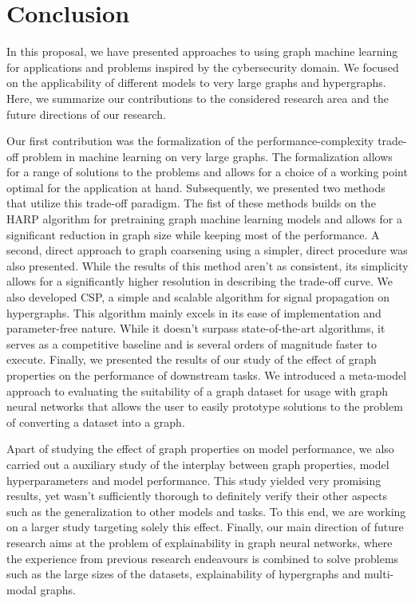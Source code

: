 \chapter{Conclusion}
\label{chap:conclusion}

In this proposal, we have presented approaches to using graph machine learning for applications and problems inspired by the cybersecurity domain. We focused on the applicability of different models to very large graphs and hypergraphs. Here, we summarize our contributions to the considered research area and the future directions of our research.

Our first contribution was the formalization of the performance-complexity trade-off problem in machine learning on very large graphs. The formalization allows for a range of solutions to the problems and allows for a choice of a working point optimal for the application at hand. Subsequently, we presented two methods that utilize this trade-off paradigm. The fist of these methods builds on the HARP algorithm for pretraining graph machine learning models and allows for a significant reduction in graph size while keeping most of the performance. A second, direct approach to graph coarsening using a simpler, direct procedure was also presented. While the results of this method aren't as consistent, its simplicity allows for a significantly higher resolution in describing the trade-off curve. We also developed CSP, a simple and scalable algorithm for signal propagation on hypergraphs. This algorithm mainly excels in its ease of implementation and parameter-free nature. While it doesn't surpass state-of-the-art algorithms, it serves as a competitive baseline and is several orders of magnitude faster to execute. Finally, we presented the results of our study of the effect of graph properties on the performance of downstream tasks. We introduced a meta-model approach to evaluating the suitability of a graph dataset for usage with graph neural networks that allows the user to easily prototype solutions to the problem of converting a dataset into a graph.

Apart of studying the effect of graph properties on model performance, we also carried out a auxiliary study of the interplay between graph properties, model hyperparameters and model performance. This study yielded very promising results, yet wasn't sufficiently thorough to definitely verify their other aspects such as the generalization to other models and tasks. To this end, we are working on a larger study targeting solely this effect. Finally, our main direction of future research aims at the problem of explainability in graph neural networks, where the experience from previous research endeavours is combined to solve problems such as the large sizes of the datasets, explainability of hypergraphs and multi-modal graphs.
